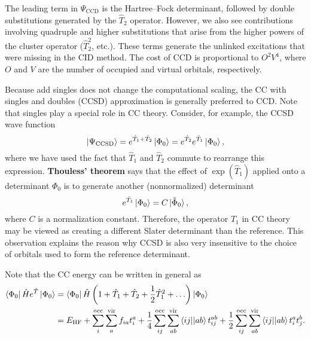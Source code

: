 \documentclass[../Main/chem532-notes.tex]{subfiles}
\begin{document}
The leading term in $\Psi_{\mathrm{CCD}}$ is the Hartree--Fock determinant, followed by double substitutions generated by the $\hat{T}_2$ operator. However, we also see contributions involving quadruple and higher substitutions that arise from the higher powers of the cluster operator ($\hat{T}_2^2$, etc.). These terms generate the unlinked excitations that were missing in the CID method.
The cost of CCD is proportional to $O^2V^4$, where $O$ and $V$ are the number of occupied and virtual orbitals, respectively.

Because add singles does not change the computational scaling, the CC with singles and doubles (CCSD) approximation is generally preferred to CCD. Note that singles play a special role in CC theory. Consider, for example, the CCSD wave function
\begin{equation}
\ket{\Psi_{\mathrm{CCSD}}} = e^{\hat{T}_1 + \hat{T}_2} \ket{\Phi_0}
= e^{\hat{T}_2}e^{\hat{T}_1} \ket{\Phi_0},
\end{equation}
where we have used the fact that $\hat{T}_1$ and $\hat{T}_2$ commute to rearrange this expression.
\textbf{Thouless' theorem} says that the effect of  $\exp(\hat{T}_1)$ applied onto a determinant $\Phi_0$ is to generate another (nonnormalized) determinant
\begin{equation}
e^{\hat{T}_1} \ket{\Phi_0} = C \ket{\tilde{\Phi}_0},
\end{equation}
where $C$ is a normalization constant.
Therefore, the operator $\hat{T}_1$ in CC theory may be viewed as creating a different Slater determinant than the reference. This observation explains the reason why CCSD is also very insensitive to the choice of orbitals used to form the reference determinant.

Note that the CC energy can be written in general as
\begin{equation}
\begin{split}
\bra{\Phi_0}\hat{H}e^{\hat{T}}\ket{\Phi_0} & = \bra{\Phi_0}\hat{H}\left(1 + \hat{T}_1 + \hat{T}_2  + \frac{1}{2} \hat{T}_1^2+ \ldots\right)\ket{\Phi_0} \\
& = E_{\mathrm{HF}} + 
\sum_{i}^{\mathrm{occ}} \sum_{a}^{\mathrm{vir}} f_{ia} t_{i}^{a}
+ \frac{1}{4} \sum_{ij}^{\mathrm{occ}} \sum_{ab}^{\mathrm{vir}} \bra{ij}\!\ket{ab} t_{ij}^{ab}
+ \frac{1}{2} \sum_{ij}^{\mathrm{occ}} \sum_{ab}^{\mathrm{vir}} \bra{ij}\!\ket{ab} t_{i}^{a} t_{j}^{b}.
 \end{split}
\end{equation}
\end{document}
